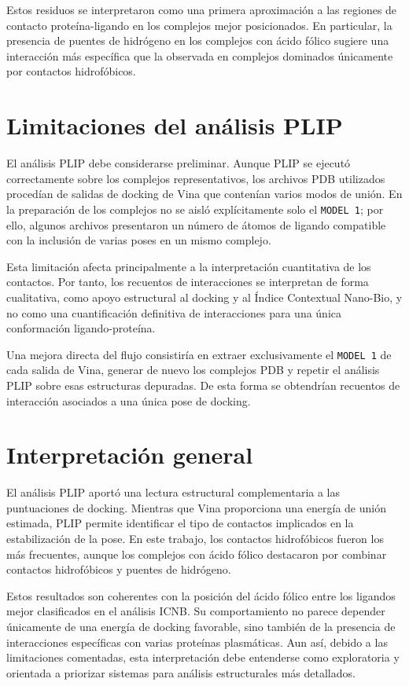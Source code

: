 \documentclass[
  spanish,
  a4paper,
  12pt,
  oneside,
  openany]{memoir}
\begin{document}
Estos residuos se interpretaron como una primera aproximación a las
regiones de contacto proteína-ligando en los complejos mejor
posicionados. En particular, la presencia de puentes de hidrógeno en los
complejos con ácido fólico sugiere una interacción más específica que la
observada en complejos dominados únicamente por contactos hidrofóbicos.

\section{Limitaciones del análisis PLIP}

El análisis PLIP debe considerarse preliminar. Aunque PLIP se ejecutó
correctamente sobre los complejos representativos, los archivos PDB
utilizados procedían de salidas de docking de Vina que contenían varios
modos de unión. En la preparación de los complejos no se aisló
explícitamente solo el \texttt{MODEL 1}; por ello, algunos archivos
presentaron un número de átomos de ligando compatible con la inclusión
de varias poses en un mismo complejo.

Esta limitación afecta principalmente a la interpretación cuantitativa
de los contactos. Por tanto, los recuentos de interacciones se
interpretan de forma cualitativa, como apoyo estructural al docking y al
Índice Contextual Nano-Bio, y no como una cuantificación definitiva de
interacciones para una única conformación ligando-proteína.

Una mejora directa del flujo consistiría en extraer exclusivamente el
\texttt{MODEL 1} de cada salida de Vina, generar de nuevo los complejos
PDB y repetir el análisis PLIP sobre esas estructuras depuradas. De esta
forma se obtendrían recuentos de interacción asociados a una única pose
de docking.

\section{Interpretación general}

El análisis PLIP aportó una lectura estructural complementaria a las
puntuaciones de docking. Mientras que Vina proporciona una energía de
unión estimada, PLIP permite identificar el tipo de contactos implicados
en la estabilización de la pose. En este trabajo, los contactos
hidrofóbicos fueron los más frecuentes, aunque los complejos con ácido
fólico destacaron por combinar contactos hidrofóbicos y puentes de
hidrógeno.

Estos resultados son coherentes con la posición del ácido fólico entre
los ligandos mejor clasificados en el análisis ICNB. Su comportamiento
no parece depender únicamente de una energía de docking favorable, sino
también de la presencia de interacciones específicas con varias
proteínas plasmáticas. Aun así, debido a las limitaciones comentadas,
esta interpretación debe entenderse como exploratoria y orientada a
priorizar sistemas para análisis estructurales más detallados.
\end{document}
